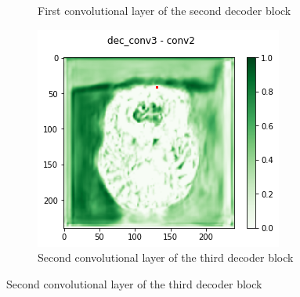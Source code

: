 \begin{figure}[H]
\begin{subfigure}{.33\textwidth}
        \caption{First convolutional layer of the second decoder block}
    \end{subfigure}%
        \begin{subfigure}{.33\textwidth}
        \centering
        \includegraphics[width=\linewidth]{chapters/04_segmentation/images/grad_cam_29.png}
        \caption{Second convolutional layer of the third decoder block}
    \end{subfigure}


\end{figure}
